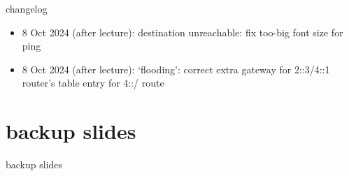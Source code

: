 \date{}
\title{}
\date{}

\begin{frame}
    \titlepage
\end{frame}

{\changelogmode
\begin{frame}{changelog}
\begin{itemize}
\item 8 Oct 2024 (after lecture): destination unreachable: fix too-big font size for ping
\item 8 Oct 2024 (after lecture): `flooding': correct extra gateway for 2::3/4::1 router's table entry for 4::/ route
\end{itemize}
\end{frame}
}



\section{backup slides}
\begin{frame}{backup slides}
\end{frame}


